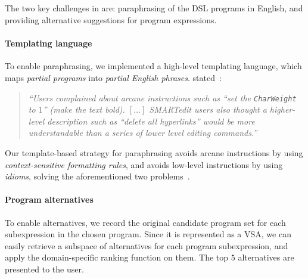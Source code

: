 \subsection{\ProgramNavigation}
The two key challenges in \ProgramNavigation are: paraphrasing of the DSL programs in English, and providing alternative
suggestions for program expressions.

\paragraph{Templating language}
To enable paraphrasing, we implemented a high\hyp{}level templating language, which maps \emph{partial programs} into
\emph{partial English phrases}.
\citeauthor{pbd-fail} stated~\cite{pbd-fail}:
\begin{quote}
    \textit{``Users complained about arcane
        instructions such as ``set the \texttt{CharWeight} to $1$'' (make the text bold).
        $[\ldots]$ SMARTedit users also thought a higher-level description such as ``delete all
    hyperlinks'' would be more understandable than a series of lower level editing commands.''}
\end{quote}
Our template-based strategy for paraphrasing avoids arcane instructions by using \emph{context-sensitive formatting
rules}, and avoids low-level instructions by using \emph{idioms}, solving the aforementioned two
problems~\cite{flashprog}.

\paragraph{Program alternatives}
To enable alternatives, we record the original candidate program set for each subexpression in the chosen program.
Since it is represented as a VSA, we can easily retrieve a subspace of alternatives for each program subexpression, and
apply the domain-specific ranking function on them.
The top $5$ alternatives are presented to the user.

